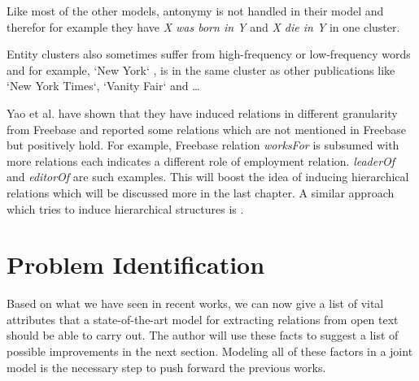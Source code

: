  Like most of the other models, antonymy is not handled in their model and therefor for example they have
 \emph{X was born in Y} and \emph{X die in Y} in one cluster.
 
 Entity clusters also sometimes suffer from high-frequency or low-frequency words and for example, `New York`
 , is in the same cluster as other publications like `New York Times`, `Vanity Fair` and \ldots
 
 Yao et al. have shown that they have induced relations in different granularity from Freebase and reported some relations
 which are not mentioned in Freebase but positively hold. For example, Freebase relation \emph{worksFor}
  is subsumed with more relations each indicates a different role of employment relation. \emph{leaderOf}
   and \emph{editorOf} are such examples. This will boost the idea of inducing hierarchical 
   relations which will be discussed more in the last chapter. A similar approach which tries to induce
    hierarchical structures is \cite{Alfonseca2012} .
 
 \section{Problem Identification}
\label{sec:prob-id}

Based on what we have seen in recent works, we can now give a list of vital
attributes that a state-of-the-art model for extracting relations from open text
should be able to carry out. The author will use these facts to suggest a list of possible improvements
in the next section. Modeling all of
these factors in a joint model is the necessary step to push forward the previous
works.

